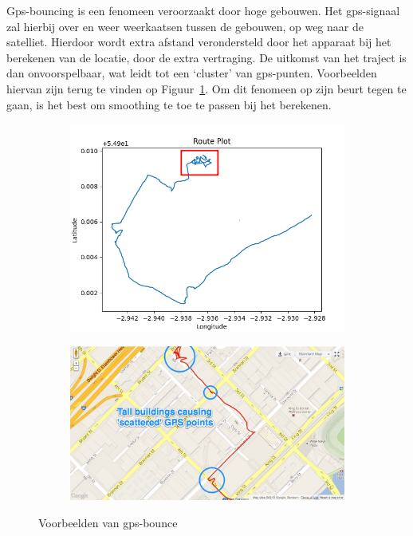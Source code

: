 Gps-bouncing is een fenomeen veroorzaakt door hoge gebouwen. Het
\ac{gps}-signaal zal hierbij over en weer weerkaatsen tussen de gebouwen, op
weg naar de satelliet. Hierdoor wordt extra afstand verondersteld door het
apparaat bij het berekenen van de locatie, door de extra vertraging. De
uitkomst van het traject is dan onvoorspelbaar, wat leidt tot een `cluster' van
\ac{gps}-punten. Voorbeelden hiervan zijn terug te vinden op
Figuur~\ref{fig:gps_bounce}. Om dit fenomeen op zijn beurt tegen te gaan, is
het best om smoothing te toe te passen bij het berekenen.
\begin{figure}
    \centering
    \begin{subfigure}[b]{0.49\textwidth}
        \centering
        \includegraphics[width=\textwidth]{fig/Afwijkingen&Analyses/Crooked Routes/Crooked GPS Route_Cart.png}
    \end{subfigure}
    \begin{subfigure}[b]{0.49\textwidth}
        \centering
        \includegraphics[width=\textwidth]{fig/Afwijkingen&Analyses/Crooked Routes/GPS_bounce_map.jpg}
    \end{subfigure}
    \caption{Voorbeelden van \ac{gps}-bounce\cite{BadGPSDa19:online}}\label{fig:gps_bounce}
\end{figure}

